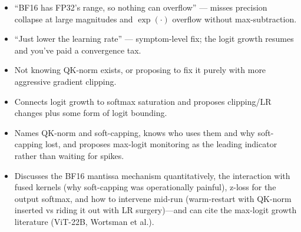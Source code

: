 \begin{interviewq}
\redflags
\begin{itemize}
    \item ``BF16 has FP32's range, so nothing can overflow'' --- misses precision collapse at large magnitudes and $\exp(\cdot)$ overflow without max-subtraction.
    \item ``Just lower the learning rate'' --- symptom-level fix; the logit growth resumes and you've paid a convergence tax.
    \item Not knowing QK-norm exists, or proposing to fix it purely with more aggressive gradient clipping.
\end{itemize}


\goodgreat
\begin{itemize}
    \item {} Connects logit growth to softmax saturation and proposes clipping/LR changes plus some form of logit bounding.
    \item {} Names QK-norm and soft-capping, knows who uses them and why soft-capping lost, and proposes max-logit monitoring as the leading indicator rather than waiting for spikes.
    \item {} Discusses the BF16 mantissa mechanism quantitatively, the interaction with fused kernels (why soft-capping was operationally painful), z-loss for the output softmax, and how to intervene mid-run (warm-restart with QK-norm inserted vs riding it out with LR surgery)---and can cite the max-logit growth literature (ViT-22B, Wortsman et al.).
\end{itemize}

\end{interviewq}

